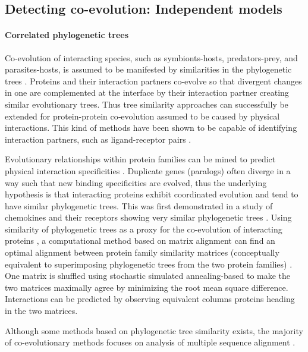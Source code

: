 \subsection{Detecting co-evolution: Independent models}

\paragraph{Correlated phylogenetic trees}
Co‐evolution of interacting species, such as symbionts-hosts, predators-prey, and parasites-hosts, is assumed to be manifested by similarities in the phylogenetic trees \cite{de2013emerging}.
Proteins and their interaction partners co-evolve so that divergent changes in one are complemented at the interface by their interaction partner  \cite{goh2000co} creating similar evolutionary trees.
Thus tree similarity approaches can successfully be extended for protein-protein co‐evolution assumed to be caused by physical interactions.
This kind of methods have been shown to be capable of identifying interaction partners, such as ligand-receptor pairs \cite{de2013emerging}.

Evolutionary relationships within protein families can be mined to predict physical interaction specificities \cite{ramani2003exploiting}.
Duplicate genes (paralogs) often diverge in a way such that new binding specificities are evolved, thus the underlying hypothesis is that interacting proteins exhibit coordinated evolution and tend to have similar phylogenetic trees.
This was first demonstrated in a study of chemokines and their receptors showing very similar phylogenetic trees \cite{ramani2003exploiting:REF}.
Using similarity of phylogenetic trees as a proxy for the co-evolution of interacting proteins \cite{ramani2003exploiting}, a computational method based on matrix alignment can find an optimal alignment between protein family similarity matrices (conceptually equivalent to superimposing  phylogenetic trees from the two protein families) \cite{ramani2003exploiting}.
One matrix is shuffled using stochastic simulated annealing-based to make the two matrices maximally agree by minimizing the root mean square difference.
Interactions can be predicted by observing equivalent columns proteins heading in the two matrices.  \cite{ramani2003exploiting}

Although some methods based on phylogenetic tree similarity exists, the majority of co-evolutionary methods focuses on analysis of multiple sequence alignment \cite{rohlfs2010detecting}.

